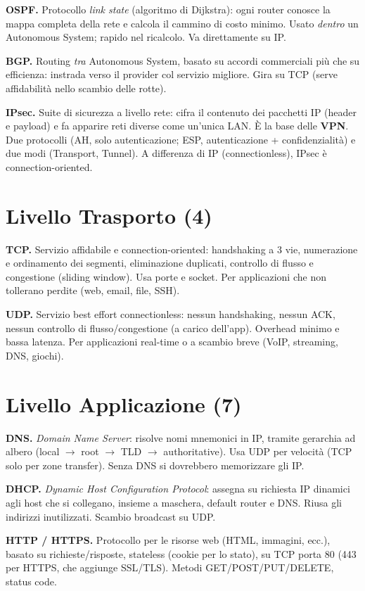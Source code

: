 \documentclass[11pt,a4paper]{report}
\begin{document}
\textbf{OSPF.} Protocollo \emph{link state} (algoritmo di Dijkstra): ogni router
conosce la mappa completa della rete e calcola il cammino di costo minimo. Usato
\emph{dentro} un Autonomous System; rapido nel ricalcolo. Va direttamente su IP.

\textbf{BGP.} Routing \emph{tra} Autonomous System, basato su accordi commerciali
più che su efficienza: instrada verso il provider col servizio migliore. Gira su
TCP (serve affidabilità nello scambio delle rotte).

\textbf{IPsec.} Suite di sicurezza a livello rete: cifra il contenuto dei
pacchetti IP (header e payload) e fa apparire reti diverse come un'unica LAN.
È la base delle \textbf{VPN}. Due protocolli (AH, solo autenticazione; ESP,
autenticazione + confidenzialità) e due modi (Transport, Tunnel). A differenza
di IP (connectionless), IPsec è connection-oriented.

\section*{Livello Trasporto (4)}

\textbf{TCP.} Servizio affidabile e connection-oriented: handshaking a 3 vie,
numerazione e ordinamento dei segmenti, eliminazione duplicati, controllo di
flusso e congestione (sliding window). Usa porte e socket. Per applicazioni che
non tollerano perdite (web, email, file, SSH).

\textbf{UDP.} Servizio best effort connectionless: nessun handshaking, nessun
ACK, nessun controllo di flusso/congestione (a carico dell'app). Overhead minimo
e bassa latenza. Per applicazioni real-time o a scambio breve (VoIP, streaming,
DNS, giochi).

\section*{Livello Applicazione (7)}

\textbf{DNS.} \emph{Domain Name Server}: risolve nomi mnemonici in IP, tramite
gerarchia ad albero (local $\to$ root $\to$ TLD $\to$ authoritative). Usa UDP per
velocità (TCP solo per zone transfer). Senza DNS si dovrebbero memorizzare gli IP.

\textbf{DHCP.} \emph{Dynamic Host Configuration Protocol}: assegna su richiesta
IP dinamici agli host che si collegano, insieme a maschera, default router e DNS.
Riusa gli indirizzi inutilizzati. Scambio broadcast su UDP.

\textbf{HTTP / HTTPS.} Protocollo per le risorse web (HTML, immagini, ecc.),
basato su richieste/risposte, stateless (cookie per lo stato), su TCP porta 80
(443 per HTTPS, che aggiunge SSL/TLS). Metodi GET/POST/PUT/DELETE, status code.
\end{document}
